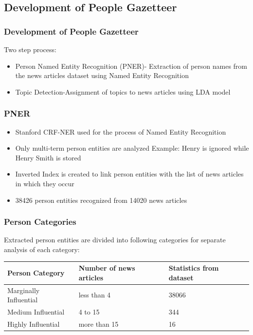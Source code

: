 \documentclass{beamer}
\begin{document}
\subsection{Development of People Gazetteer}
\begin{frame}
\frametitle{Development of People Gazetteer}
Two step process:
\begin{itemize}
\item
Person Named Entity Recognition (PNER)-
 Extraction of person names from the news articles dataset using Named Entity Recognition
\item
Topic Detection-Assignment of topics to news articles using LDA model
\end{itemize}
\end{frame}



\begin{frame}
\frametitle{PNER}
\begin{itemize}
\item
 Stanford CRF-NER used for the process of Named Entity Recognition 
\item
Only multi-term person entities are analyzed
Example: \alert {Henry} is ignored while \alert{Henry Smith} is stored
\item
Inverted Index is created to link person entities with the list of news articles in which they occur
\item
38426 person entities recognized from 14020 news articles 

\end{itemize}
\end{frame}


\begin{frame}
\frametitle{Person Categories}
 Extracted person entities are divided into following categories for separate analysis of each category:
\begin{table}[bt]
\begin{tabular}{|p{3.5cm}|p{3cm}|p{2cm}|} \hline
\textbf{Person Category} & \textbf{Number of news articles}& \textbf{Statistics from dataset} \\ \hline
Marginally Influential & less than 4 & 38066 \\ \hline
Medium Influential & 4 to 15 & 344 \\ \hline
Highly Influential & more than 15 & 16 \\ \hline
\end{tabular}
\end{table}
\end{frame}
\end{document}
